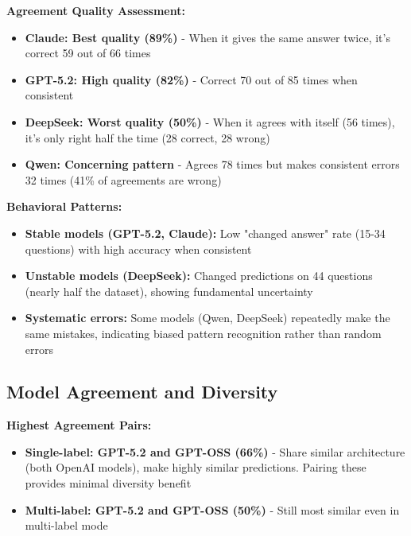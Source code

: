 \documentclass[12pt,a4paper]{article}
\begin{document}
\textbf{Agreement Quality Assessment:}
\begin{itemize}[leftmargin=*]
    \item \textbf{Claude: Best quality (89\%)} - When it gives the same answer twice, it's correct 59 out of 66 times
    
    \item \textbf{GPT-5.2: High quality (82\%)} - Correct 70 out of 85 times when consistent
    
    \item \textbf{DeepSeek: Worst quality (50\%)} - When it agrees with itself (56 times), it's only right half the time (28 correct, 28 wrong)
    
    \item \textbf{Qwen: Concerning pattern} - Agrees 78 times but makes consistent errors 32 times (41\% of agreements are wrong)
\end{itemize}

\textbf{Behavioral Patterns:}
\begin{itemize}[leftmargin=*]
    \item \textbf{Stable models (GPT-5.2, Claude):} Low "changed answer" rate (15-34 questions) with high accuracy when consistent
    
    \item \textbf{Unstable models (DeepSeek):} Changed predictions on 44 questions (nearly half the dataset), showing fundamental uncertainty
    
    \item \textbf{Systematic errors:} Some models (Qwen, DeepSeek) repeatedly make the same mistakes, indicating biased pattern recognition rather than random errors
\end{itemize}


\subsection{Model Agreement and Diversity}

\textbf{Highest Agreement Pairs:}
\begin{itemize}[leftmargin=*]
    \item \textbf{Single-label: GPT-5.2 and GPT-OSS (66\%)} - Share similar architecture (both OpenAI models), make highly similar predictions. Pairing these provides minimal diversity benefit
    
    
    \item \textbf{Multi-label: GPT-5.2 and GPT-OSS (50\%)} - Still most similar even in multi-label mode
    
\end{itemize}
\end{document}

